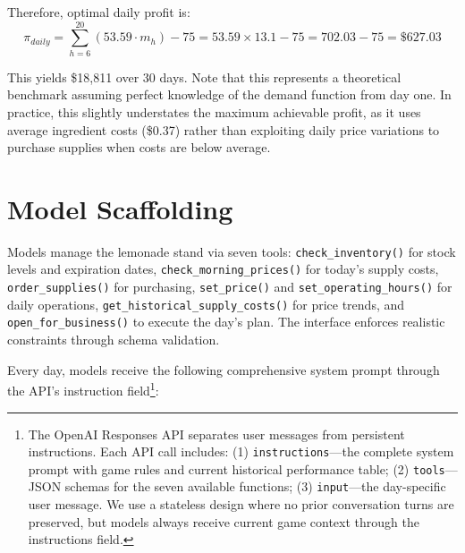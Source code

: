 \documentclass[11pt]{article}
\begin{document}
Therefore, optimal daily profit is:
\begin{equation}
\pi_{daily} = \sum_{h=6}^{20} (53.59 \cdot m_h) - 75 = 53.59 \times 13.1 - 75 = 702.03 - 75 = \$627.03
\end{equation}

This yields \$18,811 over 30 days.
Note that this represents a theoretical benchmark assuming perfect knowledge of the demand function from day one.
In practice, this slightly understates the maximum achievable profit, as it uses average ingredient costs (\$0.37) rather than exploiting daily price variations to purchase supplies when costs are below average.

\section{Model Scaffolding}

Models manage the lemonade stand via seven tools: \texttt{check\_inventory()} for stock levels and expiration dates, \texttt{check\_morning\_prices()} for today's supply costs, \texttt{order\_supplies()} for purchasing, \texttt{set\_price()} and \texttt{set\_operating\_hours()} for daily operations, \texttt{get\_historical\_supply\_costs()} for price trends, and \texttt{open\_for\_business()} to execute the day's plan. The interface enforces realistic constraints through schema validation.

Every day, models receive the following comprehensive system prompt through the API's instruction field\footnote{The OpenAI Responses API separates user messages from persistent instructions. Each API call includes: (1) \texttt{instructions}—the complete system prompt with game rules and current historical performance table; (2) \texttt{tools}—JSON schemas for the seven available functions; (3) \texttt{input}—the day-specific user message. We use a stateless design where no prior conversation turns are preserved, but models always receive current game context through the instructions field.}:
\end{document}
